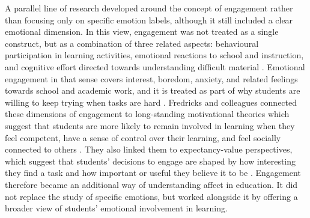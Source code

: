 A parallel line of research developed around the concept of engagement rather than focusing only on specific emotion labels, although it still included a clear emotional dimension. In this view, engagement was not treated as a single construct, but as a combination of three related aspects: behavioural participation in learning activities, emotional reactions to school and instruction, and cognitive effort directed towards understanding difficult material \cite{fredricks_httpwwwjstororg_2004}. Emotional engagement in that sense covers interest, boredom, anxiety, and related feelings towards school and academic work, and it is treated as part of why students are willing to keep trying when tasks are hard \cite{fredricks_httpwwwjstororg_2004}. Fredricks and colleagues connected these dimensions of engagement to long-standing motivational theories which suggest that students are more likely to remain involved in learning when they feel competent, have a sense of control over their learning, and feel socially connected to others \cite{connell1991competence}. They also linked them to expectancy-value perspectives, which suggest that students' decisions to engage are shaped by how interesting they find a task and how important or useful they believe it to be \cite{eccles1983expectations}. Engagement therefore became an additional way of understanding affect in education. It did not replace the study of specific emotions, but worked alongside it by offering a broader view of students' emotional involvement in learning.


